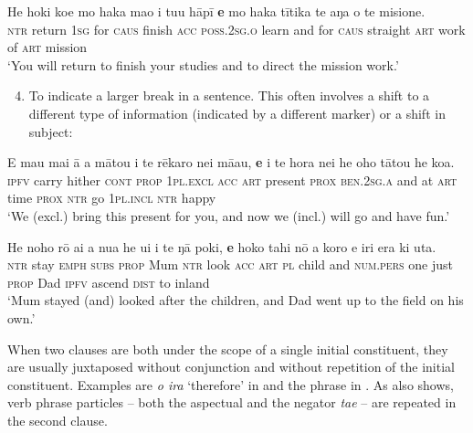 \ea\label{ex:11.10}
\gll He hoki koe mo haka mao i tu{\ꞌ}u hāpī \textbf{{\ꞌ}e} mo haka tītika  te aŋa o te misione.\\
\textsc{ntr} return \textsc{1sg} for \textsc{caus} finish \textsc{acc} \textsc{poss.2sg.o} learn and for \textsc{caus} straight  \textsc{art} work of \textsc{art} mission\\

\glt
‘You will return to finish your studies and to direct the mission work.’ \textstyleExampleref{[R231.244]} 
\z

\begin{enumerate}
\setcounter{enumi}{3}
\item 
To indicate a larger break in a sentence. This often involves a shift to a different type of information (indicated by a different  marker) or a shift in subject:
\end{enumerate}

\ea\label{ex:11.11}
\gll E ma{\ꞌ}u mai {\ꞌ}ā a mātou i te rēkaro nei mā{\ꞌ}au,  \textbf{{\ꞌ}e} {\ꞌ}i te hora nei he oho tātou he koa.\\
\textsc{ipfv} carry hither \textsc{cont} \textsc{prop} \textsc{1pl.excl} \textsc{acc} \textsc{art} present \textsc{prox} \textsc{ben.2sg.a}  and at \textsc{art} time \textsc{prox} \textsc{ntr} go \textsc{1pl.incl} \textsc{ntr} happy\\

\glt 
‘We (excl.) bring this present for you, and now we (incl.) will go and have fun.’ \textstyleExampleref{[R210.127]} 
\z

\ea\label{ex:11.12}
\gll He noho rō {\ꞌ}ai a nua he u{\ꞌ}i i te ŋā poki,  \textbf{{\ꞌ}e} hoko tahi nō a koro e iri era ki {\ꞌ}uta.\\
\textsc{ntr} stay \textsc{emph} \textsc{subs} \textsc{prop} Mum \textsc{ntr} look \textsc{acc} \textsc{art} \textsc{pl} child  and \textsc{num.pers} one just \textsc{prop} Dad \textsc{ipfv} ascend \textsc{dist} to inland\\

\glt
‘Mum stayed (and) looked after the children, and Dad went up to the field on his own.’ \textstyleExampleref{[R235.080]} 
\z


When two clauses are both under the scope of a single initial constituent, they are usually juxtaposed without conjunction and without repetition of the initial constituent. Examples are \textit{{\ꞌ}o ira} ‘therefore’ in  and the  phrase in . As  also shows, verb phrase particles – both the aspectual and the negator \textit{ta{\ꞌ}e} – are repeated in the second clause.

